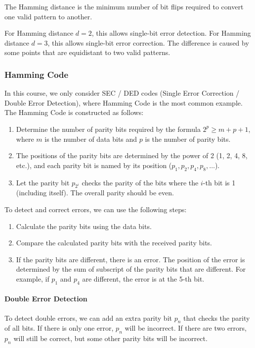 \documentclass[a4paper,12pt]{article}
\begin{document}
The Hamming distance is the minimum number of bit flips required to convert one valid pattern to another. 

For Hamming distance $d = 2$, this allows single-bit error detection. For Hamming distance $d = 3$, this allows single-bit error correction. The difference is caused by some points that are equidistant to two valid patterns.

\subsubsection{Hamming Code}

In this course, we only consider SEC / DED codes (Single Error Correction / Double Error Detection), where Hamming Code is the most common example. The Hamming Code is constructed as follows:
\begin{enumerate}
	\item Determine the number of parity bits required by the formula $2^p \geq m + p + 1$, where $m$ is the number of data bits and $p$ is the number of parity bits.
	\item The positions of the parity bits are determined by the power of 2 (1, 2, 4, 8, etc.), and each parity bit is named by its position ($p_1, p_2, p_4, p_8, \ldots$).
	\item Let the parity bit $p_{2^i}$ checks the parity of the bits where the $i$-th bit is 1 (including itself). The overall parity should be even.
\end{enumerate}

To detect and correct errors, we can use the following steps:
\begin{enumerate}
	\item Calculate the parity bits using the data bits.
	\item Compare the calculated parity bits with the received parity bits.
	\item If the parity bits are different, there is an error. The position of the error is determined by the sum of subscript of the parity bits that are different. For example, if $p_1$ and $p_4$ are different, the error is at the 5-th bit.
\end{enumerate}

\paragraph{Double Error Detection} To detect double errors, we can add an extra parity bit $p_n$ that checks the parity of all bits. If there is only one error, $p_n$ will be incorrect. If there are two errors, $p_n$ will still be correct, but some other parity bits will be incorrect.
\end{document}
